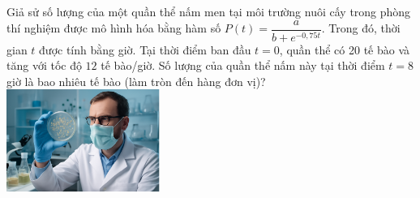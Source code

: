 \begin{ex}%
\immini
{
    Giả sử số lượng của một quần thể nấm men tại môi trường nuôi cấy trong phòng thí nghiệm được mô hình hóa bằng hàm số $ P(t)=\dfrac{a}{b+e^{-0,75t}}$. Trong đó, thời gian $ t$ được tính bằng giờ. Tại thời điểm ban đầu $t=0$, quần thể có 20 tế bào và tăng với tốc độ $12$ tế bào/giờ. Số lượng của quần thể nấm này tại thời điểm $ t=8$ giờ là bao nhiêu tế bào (làm tròn đến hàng đơn vị)?
}
{
    \includegraphics[width=5cm]{img/HXN-12-19}
}
\end{ex}
